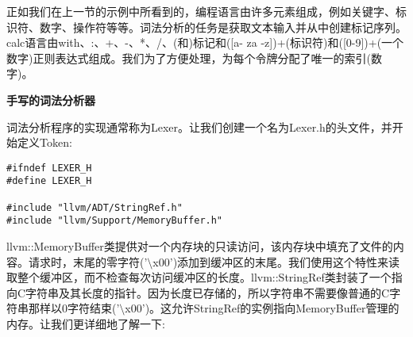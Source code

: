 正如我们在上一节的示例中所看到的，编程语言由许多元素组成，例如关键字、标识符、数字、操作符等等。词法分析的任务是获取文本输入并从中创建标记序列。calc语言由with、:、+、-、*、/、(和)标记和([a- za -z])+(标识符)和([0-9])+(一个数字)正则表达式组成。我们为了方便处理，为每个令牌分配了唯一的索引(数字)。\par

\hspace*{\fill} \par %
\textbf{手写的词法分析器}

词法分析程序的实现通常称为Lexer。让我们创建一个名为Lexer.h的头文件，并开始定义Token:\par

\begin{lstlisting}[caption={}]
#ifndef LEXER_H
#define LEXER_H

#include "llvm/ADT/StringRef.h"
#include "llvm/Support/MemoryBuffer.h"
\end{lstlisting}

llvm::MemoryBuffer类提供对一个内存块的只读访问，该内存块中填充了文件的内容。请求时，末尾的零字符('$\setminus$x00')添加到缓冲区的末尾。我们使用这个特性来读取整个缓冲区，而不检查每次访问缓冲区的长度。llvm::StringRef类封装了一个指向C字符串及其长度的指针。因为长度已存储的，所以字符串不需要像普通的C字符串那样以0字符结束('$\setminus$x00')。这允许StringRef的实例指向MemoryBuffer管理的内存。让我们更详细地了解一下:\par

